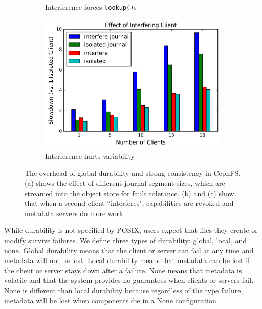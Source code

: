 \begin{figure}[t]
\begin{subfigure}[b]{.3\linewidth}
      \caption{Interference forces \texttt{lookup()}s}
      \label{fig:overhead-b}
  \end{subfigure}
  \begin{subfigure}[b]{.3\linewidth}
      \centering
      \includegraphics[width=1.0\linewidth]{graphs/slowdown-interfere-scale.png}
      \caption{Interference hurts variability}
      \label{fig:overhead-c}
  \end{subfigure}
  \caption{The overhead of global durability and strong consistency in CephFS.
  (a) shows the effect of different journal segment sizes, which are streamed
  into the object store for fault tolerance. (b) and (c) show that when a second
  client ``interferes", capabilities are revoked and metadata servers do more
  work.  \label{fig:overhead}}
\end{figure}

While durability is not specified by POSIX, users expect that files they create
or modify survive failures.  We define three types of durability: global,
local, and none.  Global
durability means that the client or server can fail at any time and metadata
will not be lost. Local durability means that metadata can be lost if the
client or server stays down after a failure. None means that metadata is volatile
and that the system provides no guarantees when clients or servers fail. 
None is different than local durability because regardless of the type failure,
metadata will be lost when components die in a None configuration.\\

